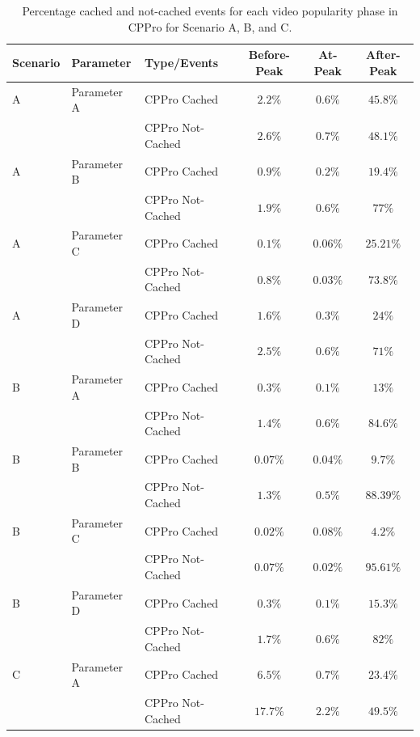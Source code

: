 \documentclass[10pt,final,journal,a4paper]{IEEEtran}
\begin{document}
\begin{table}[!t]
\caption{Percentage cached and not-cached events for each video popularity phase in CPPro for Scenario A, B, and C.}
\label{tab:stacked2a}
\centering
\begin{tabular}{|l|l|l|c|c|c|}
\hline
Scenario & Parameter & Type/Events & Before-Peak & At-Peak  & After-Peak \\
\hline
A & Parameter A & CPPro Cached & $2.2\%$ & $0.6\%$ & $45.8\%$  \\
\hline
 & & CPPro Not-Cached & $2.6\%$ & $0.7\%$ & $48.1\%$ \\
 \hline

A & Parameter B & CPPro Cached & $0.9\%$ & $0.2\%$ & $19.4\%$ \\
\hline
 & & CPPro Not-Cached & $1.9\%$ & $0.6\%$ & $77\%$ \\
\hline

A & Parameter C & CPPro Cached & $0.1\%$ & $0.06\%$ & $25.21\%$ \\
\hline
 & & CPPro Not-Cached & $0.8\%$ & $0.03\%$ & $73.8\%$ \\
\hline

A & Parameter D & CPPro Cached & $1.6\%$ & $0.3\%$ & $24\%$ \\
\hline
 & & CPPro Not-Cached & $2.5\%$ & $0.6\%$ & $71\%$ \\
\hline

B & Parameter A & CPPro Cached & $0.3\%$ & $0.1\%$ & $13\%$  \\
\hline
 & & CPPro Not-Cached & $1.4\%$ & $0.6\%$ & $84.6\%$ \\
 \hline

B & Parameter B & CPPro Cached & $0.07\%$ & $0.04\%$ & $9.7\%$ \\
\hline
 & & CPPro Not-Cached & $1.3\%$ & $0.5\%$ & $88.39\%$ \\
\hline

B & Parameter C & CPPro Cached & $0.02\%$ & $0.08\%$ & $4.2\%$ \\
\hline
 & & CPPro Not-Cached & $0.07\%$ & $0.02\%$ & $95.61\%$ \\
\hline

B & Parameter D & CPPro Cached & $0.3\%$ & $0.1\%$ & $15.3\%$ \\
\hline
 & & CPPro Not-Cached & $1.7\%$ & $0.6\%$ & $82\%$ \\
\hline

C & Parameter A & CPPro Cached & $6.5\%$ & $0.7\%$ & $23.4\%$  \\
\hline
 & & CPPro Not-Cached & $17.7\%$ & $2.2\%$ & $49.5\%$ \\
 \hline


\end{tabular}
\end{table}
\end{document}
